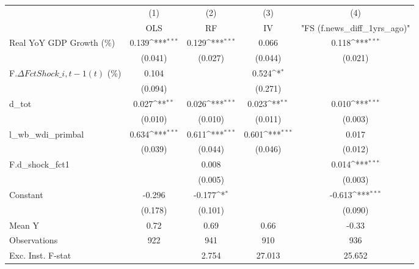 {
\def\sym#1{\ifmmode^{#1}\else\(^{#1}\)\fi}
\begin{tabular}{l*{4}{c}}
\toprule
                    &\multicolumn{1}{c}{(1)}&\multicolumn{1}{c}{(2)}&\multicolumn{1}{c}{(3)}&\multicolumn{1}{c}{(4)}\\
                    &\multicolumn{1}{c}{OLS}&\multicolumn{1}{c}{RF}&\multicolumn{1}{c}{IV}&\multicolumn{1}{c}{ "FS (f.news\_diff\_1yrs\_ago)" }\\
\midrule
Real YoY GDP Growth (\%)&       0.139\sym{***}&       0.129\sym{***}&       0.066         &       0.118\sym{***}\\
                    &     (0.041)         &     (0.027)         &     (0.044)         &     (0.021)         \\
\addlinespace
F.$\Delta FctShock\_{i,t-1}(t)$ (\%)&       0.104         &                     &       0.524\sym{*}  &                     \\
                    &     (0.094)         &                     &     (0.271)         &                     \\
\addlinespace
d\_tot               &       0.027\sym{**} &       0.026\sym{***}&       0.023\sym{**} &       0.010\sym{***}\\
                    &     (0.010)         &     (0.010)         &     (0.011)         &     (0.003)         \\
\addlinespace
l\_wb\_wdi\_primbal    &       0.634\sym{***}&       0.611\sym{***}&       0.601\sym{***}&       0.017         \\
                    &     (0.039)         &     (0.044)         &     (0.046)         &     (0.012)         \\
\addlinespace
F.d\_shock\_fct1      &                     &       0.008         &                     &       0.014\sym{***}\\
                    &                     &     (0.005)         &                     &     (0.003)         \\
\addlinespace
Constant            &      -0.296         &      -0.177\sym{*}  &                     &      -0.613\sym{***}\\
                    &     (0.178)         &     (0.101)         &                     &     (0.090)         \\
\midrule
Mean Y              &        0.72         &        0.69         &        0.66         &       -0.33         \\
Observations        &         922         &         941         &         910         &         936         \\
Exc. Inst. F-stat   &                     &       2.754         &      27.013         &      25.652         \\
\bottomrule
\end{tabular}
}
